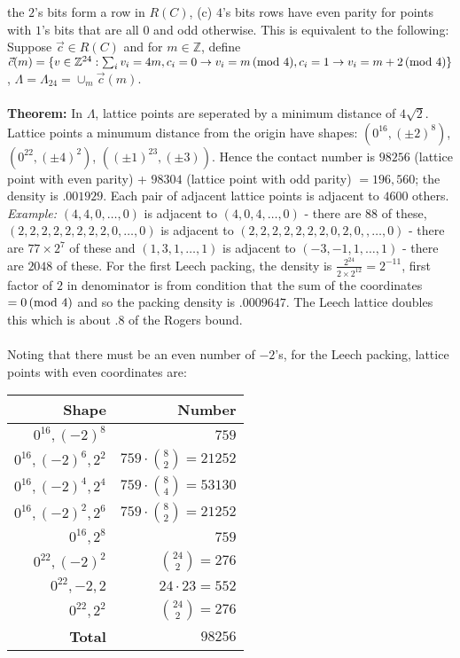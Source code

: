 the $2$'s bits form a row in $R(C)$, (c) $4$'s bits rows have even parity for points
with $1$'s bits that are all $0$ and odd otherwise. This is equivalent to the following:
Suppose ${\vec c} \in R(C)$ and for $m \in {\mathbb Z}$, define
${\vec c}(m)= \{  
v \in {\mathbb Z}^{24}:  \sum_i v_i = 4m, 
c_i = 0 \rightarrow v_i = m \thinspace \textnormal{(mod } 4 \textnormal{)},
c_i = 1 \rightarrow v_i = m+2 \thinspace \textnormal{(mod } 4 \textnormal{)}
\}$,
$\Lambda = \Lambda_{24}= \cup_m {\vec c}(m)$.
\\
\\
{\bf Theorem:}   In $\Lambda$, lattice points are seperated by a minimum
distance of $4 {\sqrt 2}$.  Lattice points a minumum distance from the origin
have shapes: $(0^{16}, (\pm 2)^8)$, $(0^{22}, (\pm 4)^2)$, $((\pm 1)^{23}, (\pm 3))$.  
Hence the contact number is $98256$ (lattice point with even parity) + $98304$ 
(lattice point with odd parity) $= 196,560$;  
the density is $.001929$.  Each pair of adjacent lattice points is adjacent to $4600$
others. \emph{Example:} $(4,4, 0, \ldots, 0)$
is adjacent to $(4, 0, 4, \ldots , 0)$ - there are $88$ of these,
$(2,2,2,2,2,2,2,2,0, \ldots , 0)$ is adjacent to $(2,2,2,2,2,2,2,0,2, 0,, \ldots , 0)$
- there are $77 \times 2^7$ of these and
$(1,3,1, \ldots , 1)$ is adjacent to $(-3,-1,1, \ldots , 1)$ - there are $2048$ of these.
For the first Leech packing,
the density is ${\frac {2^{24}} { 2 \times 2^{12}}}= 2^{-11}$, 
first factor of $2$ in denominator is from condition that the sum of the
coordinates $= 0 \thinspace \textnormal{(mod } 4 \textnormal{)}$ and so the packing density is $.0009647$.  The
Leech lattice doubles this which is about $.8$ of the Rogers bound.
\\
\\
Noting that there must be an even number of $-2$'s,
for the Leech packing, lattice points with even coordinates are:
\begin{center}
\begin{tabular} {|r|r|}
\hline
{\bf Shape} & {\bf Number} \\
\hline
$0^{16}, (-2)^8$ & $759$ \\
$0^{16}, (-2)^6, 2^2$ & $759 \cdot {8 \choose 2}=21252$ \\
$0^{16}, (-2)^4, 2^4$ & $759 \cdot {8 \choose 4}=53130$ \\
$0^{16}, (-2)^2, 2^6$ & $759 \cdot {8 \choose 2}=21252$ \\
$0^{16}, 2^8$ & $759$ \\
$0^{22}, (-2)^2$ & ${24 \choose 2}=276$ \\
$0^{22}, -2, 2$ & $ 24 \cdot 23 =552$ \\
$0^{22}, 2^2$ & ${24 \choose 2}=276$ \\
\hline
{\bf Total} & $98256$\\
\hline
\end{tabular}
\end{center}
